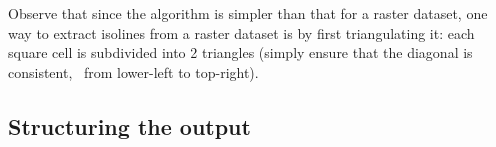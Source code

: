 Observe that since the algorithm is simpler than that for a raster dataset, one way to extract isolines from a raster dataset is by first triangulating it: each square cell is subdivided into 2 triangles (simply ensure that the diagonal is consistent, \eg\ from lower-left to top-right).








\subsection{Structuring the output}%
\label{sec:structuring}

